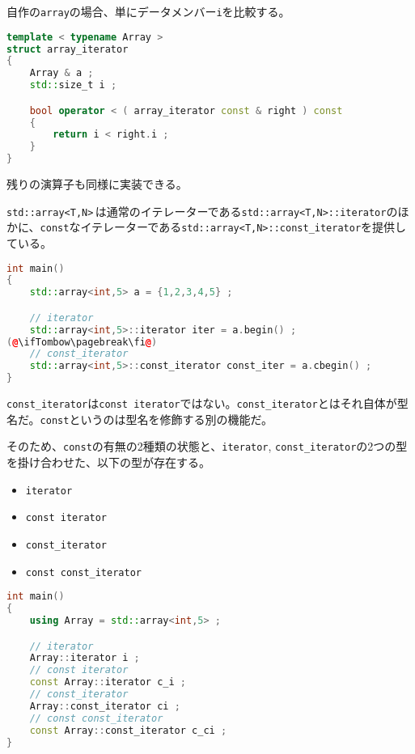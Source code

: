 自作の\texttt{array}の場合、単にデータメンバー\texttt{i}を比較する。

\begin{lstlisting}[language={C++}]
template < typename Array >
struct array_iterator
{
    Array & a ;
    std::size_t i ;

    bool operator < ( array_iterator const & right ) const
    {
        return i < right.i ;
    }
}
\end{lstlisting}

残りの演算子も同様に実装できる。


\texttt{std::array<T,N>}\,は通常のイテレーターである\texttt{std::array<T,N>::iterator}のほかに、\texttt{const}なイテレーターである\texttt{std::array<T,N>::const\_iterator}を提供している。

\begin{lstlisting}[language={C++}]
int main()
{
    std::array<int,5> a = {1,2,3,4,5} ;

    // iterator
    std::array<int,5>::iterator iter = a.begin() ;
(@\ifTombow\pagebreak\fi@)
    // const_iterator
    std::array<int,5>::const_iterator const_iter = a.cbegin() ;
}
\end{lstlisting}

\texttt{const\_iterator}は\texttt{const iterator}ではない。\texttt{const\_iterator}とはそれ自体が型名だ。\texttt{const}というのは型名を修飾する別の機能だ。

そのため、\texttt{const}の有無の2種類の状態と、\texttt{iterator}, \texttt{const\_iterator}の2つの型を掛け合わせた、以下の型が存在する。

\begin{itemize}
\item
  \texttt{iterator}
\item
  \texttt{const iterator}
\item
  \texttt{const\_iterator}
\item
  \texttt{const const\_iterator}
\end{itemize}

\begin{lstlisting}[language={C++}]
int main()
{
    using Array = std::array<int,5> ;

    // iterator 
    Array::iterator i ;
    // const iterator
    const Array::iterator c_i ;
    // const_iterator
    Array::const_iterator ci ;
    // const const_iterator
    const Array::const_iterator c_ci ;
}
\end{lstlisting}

